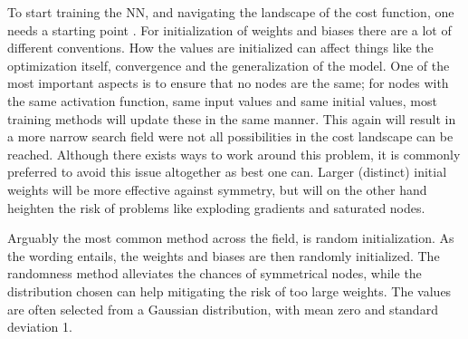 To start training the NN, and navigating the landscape of the cost function, one needs a starting point \citep[p.297]{Goodfellow-et-al-2016}. For initialization of weights and biases there are a lot of different conventions. How the values are initialized can affect things like the optimization itself, convergence and the generalization of the model. 
One of the most important aspects is to ensure that no nodes are the same; for nodes with the same activation function, same input values and same initial values, most training methods will update these in the same manner. This again will result in a more narrow search field were not all possibilities in the cost landscape can be reached. Although there exists ways to work around this problem, it is commonly preferred to avoid this issue altogether as best one can. 
Larger (distinct) initial weights will be more effective against symmetry, but will on the other hand heighten the risk of problems like exploding gradients and saturated nodes. 

Arguably the most common method across the field, is random initialization. As the wording entails, the weights and biases are then randomly initialized. The randomness method alleviates the chances of symmetrical nodes, while the distribution chosen can help mitigating the risk of too large weights. The values are often selected from a Gaussian distribution, with mean zero and standard deviation 1. 


